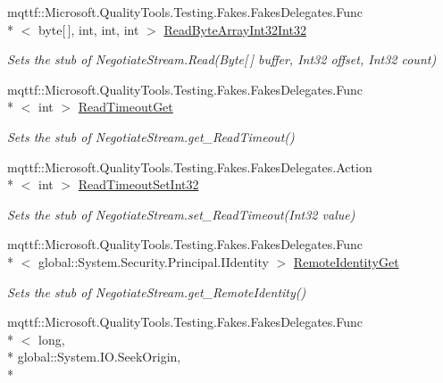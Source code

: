 \begin{DoxyCompactItemize}
mqttf\-::\-Microsoft.\-Quality\-Tools.\-Testing.\-Fakes.\-Fakes\-Delegates.\-Func\\*
$<$ byte\mbox{[}$\,$\mbox{]}, int, int, int $>$ \hyperlink{class_system_1_1_net_1_1_security_1_1_fakes_1_1_stub_negotiate_stream_ac7da4bb473ab1c57bb0156e8e089abc3}{Read\-Byte\-Array\-Int32\-Int32}
\begin{DoxyCompactList}\small\item\em Sets the stub of Negotiate\-Stream.\-Read(\-Byte\mbox{[}$\,$\mbox{]} buffer, Int32 offset, Int32 count)\end{DoxyCompactList}\item 
mqttf\-::\-Microsoft.\-Quality\-Tools.\-Testing.\-Fakes.\-Fakes\-Delegates.\-Func\\*
$<$ int $>$ \hyperlink{class_system_1_1_net_1_1_security_1_1_fakes_1_1_stub_negotiate_stream_a3de019eb176c42ca9141103d2d923e6b}{Read\-Timeout\-Get}
\begin{DoxyCompactList}\small\item\em Sets the stub of Negotiate\-Stream.\-get\-\_\-\-Read\-Timeout()\end{DoxyCompactList}\item 
mqttf\-::\-Microsoft.\-Quality\-Tools.\-Testing.\-Fakes.\-Fakes\-Delegates.\-Action\\*
$<$ int $>$ \hyperlink{class_system_1_1_net_1_1_security_1_1_fakes_1_1_stub_negotiate_stream_af8090ba02b7c4a3ee413df1c575bb6df}{Read\-Timeout\-Set\-Int32}
\begin{DoxyCompactList}\small\item\em Sets the stub of Negotiate\-Stream.\-set\-\_\-\-Read\-Timeout(\-Int32 value)\end{DoxyCompactList}\item 
mqttf\-::\-Microsoft.\-Quality\-Tools.\-Testing.\-Fakes.\-Fakes\-Delegates.\-Func\\*
$<$ global\-::\-System.\-Security.\-Principal.\-I\-Identity $>$ \hyperlink{class_system_1_1_net_1_1_security_1_1_fakes_1_1_stub_negotiate_stream_a598e8d2ee6905b5851c04d22332332fd}{Remote\-Identity\-Get}
\begin{DoxyCompactList}\small\item\em Sets the stub of Negotiate\-Stream.\-get\-\_\-\-Remote\-Identity()\end{DoxyCompactList}\item 
mqttf\-::\-Microsoft.\-Quality\-Tools.\-Testing.\-Fakes.\-Fakes\-Delegates.\-Func\\*
$<$ long, \\*
global\-::\-System.\-I\-O.\-Seek\-Origin, \\*

\end{DoxyCompactItemize}
